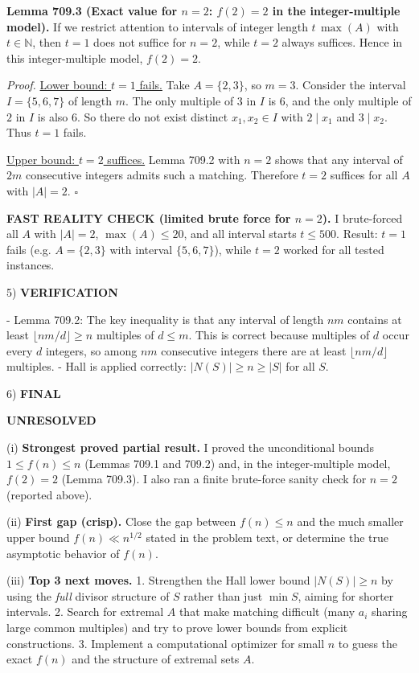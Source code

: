 \textbf{Lemma 709.3 (Exact value for $n=2$: $f(2)=2$ in the integer-multiple model).}
If we restrict attention to intervals of integer length $t\,\max(A)$ with $t\in\mathbb{N}$, then $t=1$ does not suffice for $n=2$, while $t=2$ always suffices. Hence in this integer-multiple model, $f(2)=2$.

\textit{Proof.}
\underline{Lower bound: $t=1$ fails.}
Take $A=\{2,3\}$, so $m=3$.
Consider the interval $I=\{5,6,7\}$ of length $m$.
The only multiple of $3$ in $I$ is $6$, and the only multiple of $2$ in $I$ is also $6$.
So there do not exist distinct $x_1,x_2\in I$ with $2\mid x_1$ and $3\mid x_2$.
Thus $t=1$ fails.

\underline{Upper bound: $t=2$ suffices.}
Lemma 709.2 with $n=2$ shows that any interval of $2m$ consecutive integers admits such a matching.
Therefore $t=2$ suffices for all $A$ with $|A|=2$.
\hfill$\square$

\textbf{FAST REALITY CHECK (limited brute force for $n=2$).}
I brute-forced all $A$ with $|A|=2$, $\max(A)\le 20$, and all interval starts $t\le 500$.
Result: $t=1$ fails (e.g. $A=\{2,3\}$ with interval $\{5,6,7\}$), while $t=2$ worked for all tested instances.

5) \textbf{VERIFICATION}

- Lemma 709.2: The key inequality is that any interval of length $nm$ contains at least $\lfloor nm/d\rfloor\ge n$ multiples of $d\le m$.
This is correct because multiples of $d$ occur every $d$ integers, so among $nm$ consecutive integers there are at least $\lfloor nm/d\rfloor$ multiples.
- Hall is applied correctly: $|N(S)|\ge n\ge |S|$ for all $S$.

6) \textbf{FINAL}

\textbf{UNRESOLVED}

(i) \textbf{Strongest proved partial result.}
I proved the unconditional bounds $1\le f(n)\le n$ (Lemmas 709.1 and 709.2) and, in the integer-multiple model, $f(2)=2$ (Lemma 709.3). I also ran a finite brute-force sanity check for $n=2$ (reported above).

(ii) \textbf{First gap (crisp).}
Close the gap between $f(n)\le n$ and the much smaller upper bound $f(n)\ll n^{1/2}$ stated in the problem text, or determine the true asymptotic behavior of $f(n)$.

(iii) \textbf{Top 3 next moves.}
1. Strengthen the Hall lower bound $|N(S)|\ge n$ by using the \emph{full} divisor structure of $S$ rather than just $\min S$, aiming for shorter intervals.
2. Search for extremal $A$ that make matching difficult (many $a_i$ sharing large common multiples) and try to prove lower bounds from explicit constructions.
3. Implement a computational optimizer for small $n$ to guess the exact $f(n)$ and the structure of extremal sets $A$.

